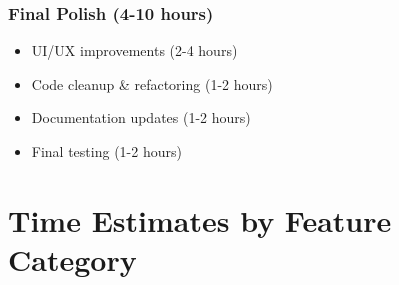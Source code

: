 \documentclass[11pt,a4paper]{article}
\begin{document}
\subsubsection{Final Polish (4-10 hours)}
\begin{itemize}
    \item UI/UX improvements (2-4 hours)
    \item Code cleanup \& refactoring (1-2 hours)
    \item Documentation updates (1-2 hours)
    \item Final testing (1-2 hours)
\end{itemize}

\newpage

\section{Time Estimates by Feature Category}
\end{document}
